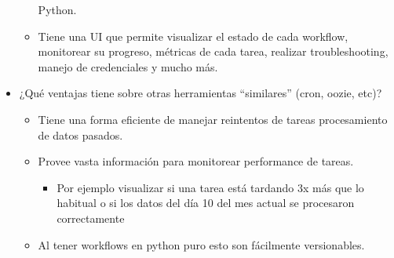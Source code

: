 \documentclass[leqno, 10pt, envcountsect]{beamer}
\numberwithin{equation}{section}
\theoremstyle{definition}
\theoremstyle{example}
\numberwithin{figure}{section}
\numberwithin{table}{section}
\let\olditem\item
\renewcommand{\item}{%
\olditem\vspace{1pt}}
\begin{document}
\begin{frame}[fragile=singleslide]
\begin{itemize}
\begin{itemize}
        Python.
      \item Tiene una UI que permite visualizar el estado de cada workflow,
        monitorear su progreso, métricas de cada tarea, realizar
        troubleshooting, manejo de credenciales y mucho más.
    \end{itemize}
  \item ¿Qué ventajas tiene sobre otras herramientas \enquote{similares} (cron, oozie,
    etc)?
    \begin{itemize}
      \item Tiene una forma eficiente de manejar reintentos de tareas procesamiento de datos pasados.
      \item Provee vasta información para monitorear performance de tareas.
        \begin{itemize}
          \item Por ejemplo visualizar si una tarea está tardando 3x más que lo habitual
          o si los datos del día 10 del mes actual se procesaron correctamente
        \end{itemize}
      \item Al tener workflows en python puro esto son fácilmente versionables.
    \end{itemize}
  \end{itemize}
\end{frame}
\end{document}
